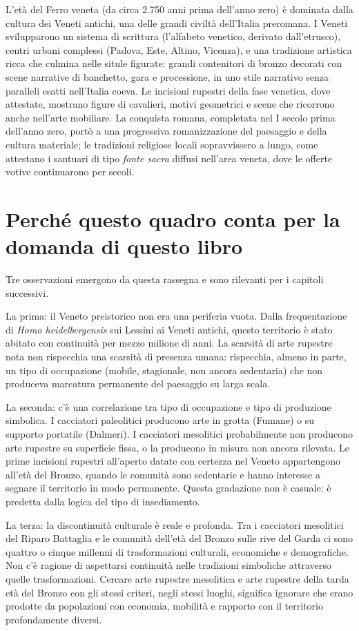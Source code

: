 L'età del Ferro veneta (da circa 2.750 anni prima dell'anno zero) è dominata dalla cultura dei Veneti antichi, una delle grandi civiltà dell'Italia preromana. I Veneti svilupparono un sistema di scrittura (l'alfabeto venetico, derivato dall'etrusco), centri urbani complessi (Padova, Este, Altino, Vicenza), e una tradizione artistica ricca che culmina nelle situle figurate: grandi contenitori di bronzo decorati con scene narrative di banchetto, gara e processione, in uno stile narrativo senza paralleli esatti nell'Italia coeva. Le incisioni rupestri della fase venetica, dove attestate, mostrano figure di cavalieri, motivi geometrici e scene che ricorrono anche nell'arte mobiliare. La conquista romana, completata nel I secolo prima dell'anno zero, portò a una progressiva romanizzazione del paesaggio e della cultura materiale; le tradizioni religiose locali sopravvissero a lungo, come attestano i santuari di tipo \textit{fonte sacra} diffusi nell'area veneta, dove le offerte votive continuarono per secoli.

\section{Perché questo quadro conta per la domanda di questo libro}

Tre osservazioni emergono da questa rassegna e sono rilevanti per i capitoli successivi.

La prima: il Veneto preistorico non era una periferia vuota. Dalla frequentazione di \textit{Homo heidelbergensis} sui Lessini ai Veneti antichi, questo territorio è stato abitato con continuità per mezzo milione di anni. La scarsità di arte rupestre nota non rispecchia una scarsità di presenza umana: rispecchia, almeno in parte, un tipo di occupazione (mobile, stagionale, non ancora sedentaria) che non produceva marcatura permanente del paesaggio su larga scala.

La seconda: c'è una correlazione tra tipo di occupazione e tipo di produzione simbolica. I cacciatori paleolitici producono arte in grotta (Fumane) o su supporto portatile (Dalmeri). I cacciatori mesolitici probabilmente non producono arte rupestre su superficie fissa, o la producono in misura non ancora rilevata. Le prime incisioni rupestri all'aperto datate con certezza nel Veneto appartengono all'età del Bronzo, quando le comunità sono sedentarie e hanno interesse a segnare il territorio in modo permanente. Questa gradazione non è casuale: è predetta dalla logica del tipo di insediamento.

La terza: la discontinuità culturale è reale e profonda. Tra i cacciatori mesolitici del Riparo Battaglia e le comunità dell'età del Bronzo sulle rive del Garda ci sono quattro o cinque millenni di trasformazioni culturali, economiche e demografiche. Non c'è ragione di aspettarsi continuità nelle tradizioni simboliche attraverso quelle trasformazioni. Cercare arte rupestre mesolitica e arte rupestre della tarda età del Bronzo con gli stessi criteri, negli stessi luoghi, significa ignorare che erano prodotte da popolazioni con economia, mobilità e rapporto con il territorio profondamente diversi.
